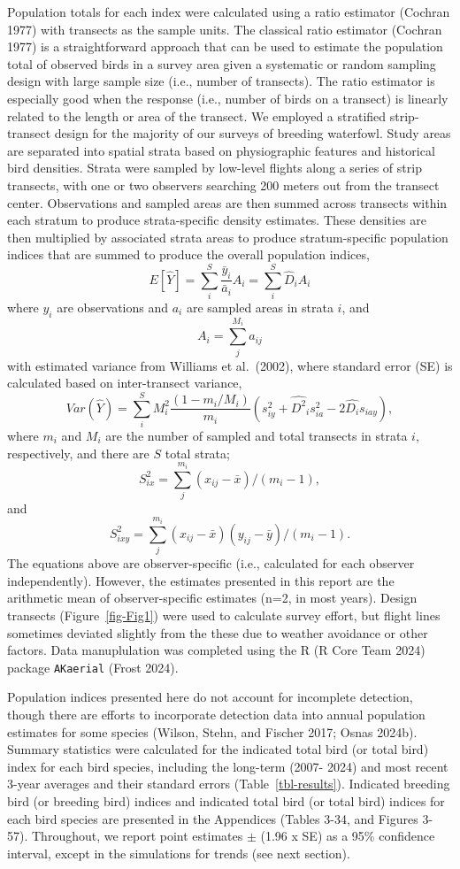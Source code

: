 \documentclass[
]{article}
\begin{document}
Population totals for each index were calculated using a ratio estimator
(Cochran 1977) with transects as the sample units. The classical ratio
estimator (Cochran 1977) is a straightforward approach that can be used
to estimate the population total of observed birds in a survey area
given a systematic or random sampling design with large sample size
(i.e., number of transects). The ratio estimator is especially good when
the response (i.e., number of birds on a transect) is linearly related
to the length or area of the transect. We employed a stratified
strip-transect design for the majority of our surveys of breeding
waterfowl. Study areas are separated into spatial strata based on
physiographic features and historical bird densities. Strata were
sampled by low-level flights along a series of strip transects, with one
or two observers searching 200 meters out from the transect center.
Observations and sampled areas are then summed across transects within
each stratum to produce strata-specific density estimates. These
densities are then multiplied by associated strata areas to produce
stratum-specific population indices that are summed to produce the
overall population indices,
\[E[\hat Y] = \displaystyle\sum_{i}^{S} \frac{\bar y_i}{\bar a_i} A_i = \displaystyle\sum_{i}^{S} \hat D_i A_i\]
where \(y_i\) are observations and \(a_i\) are sampled areas in strata
\(i\), and \[A_i = \displaystyle\sum_{j}^{M_i} a_{ij}\] with estimated
variance from Williams et al.~(2002), where standard error (SE) is
calculated based on inter-transect variance,~
\[Var(\hat Y) = \displaystyle\sum_{i}^{S} M_i^2 \frac{(1-m_i / M_i)}{m_i} ( s^2_{iy} + \hat {D^2}_i s^2_{ia} - 2 \hat {D_i} s_{iay} ),\]
where \(m_i\) and \(M_i\) are the number of sampled and total transects
in strata \(i\), respectively, and there are \(S\) total strata;~
\[S^2_{ix} = \displaystyle\sum_{j}^{m_i} (x_{ij} - \bar x )/(m_i -1), \]
and~
\[S^2_{ixy} = \displaystyle\sum_{j}^{m_i} (x_{ij} - \bar x )(y_{ij} - \bar y )/(m_i -1).\]
The equations above are observer-specific (i.e., calculated for each
observer independently). However, the estimates presented in this report
are the arithmetic mean of observer-specific estimates (n=2, in most
years). Design transects (Figure~\ref{fig-Fig1}) were used to calculate
survey effort, but flight lines sometimes deviated slightly from the
these due to weather avoidance or other factors. Data manuplulation was
completed using the R (R Core Team 2024) package \texttt{AKaerial}
(Frost 2024).

Population indices presented here do not account for incomplete
detection, though there are efforts to incorporate detection data into
annual population estimates for some species (Wilson, Stehn, and Fischer
2017; Osnas 2024b). Summary statistics were calculated for the indicated
total bird (or total bird) index for each bird species, including the
long-term (2007- 2024) and most recent 3-year averages and their
standard errors (Table~\ref{tbl-results}). Indicated breeding bird (or
breeding bird) indices and indicated total bird (or total bird) indices
for each bird species are presented in the Appendices (Tables 3-34, and
Figures 3-57). Throughout, we report point estimates \(\pm\) (1.96 x SE)
as a 95\% confidence interval, except in the simulations for trends (see
next section).
\end{document}
